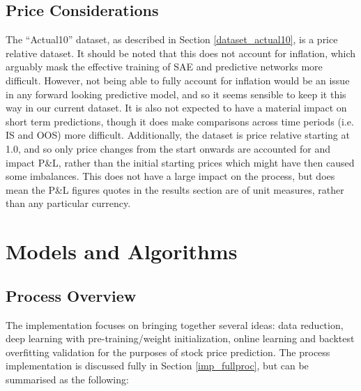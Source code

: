 \documentclass[a4paper,11pt,oneside]{article}
\theoremstyle{plain}
\theoremstyle{definition}
\begin{document}
	\subsection{Price Considerations}\label{data_prices}
	
	The ``Actual10'' dataset, as described in Section \ref{dataset_actual10}, is a price relative dataset. It should be noted that this does not account for inflation, which arguably mask the effective training of SAE and predictive networks more difficult. However, not being able to fully account for inflation would be an issue in any forward looking predictive model, and so it seems sensible to keep it this way in our current dataset. It is also not expected to have a material impact on short term predictions, though it does make comparisons across time periods (i.e. IS and OOS) more difficult. Additionally, the dataset is price relative starting at 1.0, and so only price changes from the start onwards are accounted for and impact P\&L, rather than the initial starting prices which might have then caused some imbalances. This does not have a large impact on the process, but does mean the P\&L figures quotes in the results section are of unit measures, rather than any particular currency.
	
	\newpage
	\section{Models and Algorithms}\label{Implementation}
	\subsection{Process Overview}\label{ProcessOverview}\label{imp_overview}
	
	
	The implementation focuses on bringing together several ideas: data reduction, deep learning with pre-training/weight initialization, online learning and backtest overfitting validation for the purposes of stock price prediction. The process implementation is discussed fully in Section \ref{imp_fullproc}, but can be summarised as the following:
	
\end{document}
